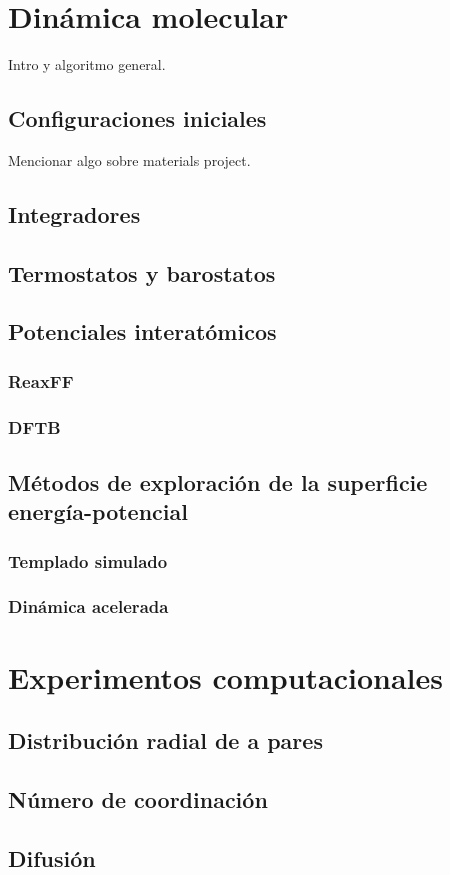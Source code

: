 \section{Dinámica molecular}

Intro y algoritmo general.

\subsection{Configuraciones iniciales}

Mencionar algo sobre materials project.

\subsection{Integradores}

\subsection{Termostatos y barostatos}

\subsection{Potenciales interatómicos}

\subsubsection{ReaxFF}

\subsubsection{DFTB}

\subsection{Métodos de exploración de la superficie energía-potencial}

\subsubsection{Templado simulado}

\subsubsection{Dinámica acelerada}

\section{Experimentos computacionales}

\subsection{Distribución radial de a pares}

\subsection{Número de coordinación}

\subsection{Difusión}
